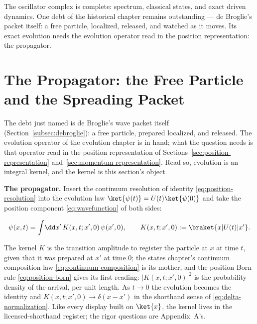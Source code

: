 The oscillator complex is complete: spectrum, classical states, and exact driven dynamics. One debt of the historical chapter remains outstanding --- de Broglie's packet itself: a free particle, localized, released, and watched as it moves. Its exact evolution needs the evolution operator read in the position representation: the propagator.

\section{The Propagator: the Free Particle and the Spreading Packet}
\label{sec:propagator}

The debt just named is de Broglie's wave packet itself (Section~\ref{subsec:debroglie}): a free particle, prepared localized, and released. The evolution operator of the evolution chapter is in hand; what the question needs is that operator read in the position representation of Sections~\ref{sec:position-representation} and~\ref{sec:momentum-representation}. Read so, evolution is an integral kernel, and the kernel is this section's object.

\medskip\noindent\textbf{The propagator.} Insert the continuum resolution of identity \eqref{eq:position-resolution} into the evolution law $\ket{\psi(t)} = U(t)\ket{\psi(0)}$ and take the position component \eqref{eq:wavefunction} of both sides:
\begin{linenomath}
    \begin{equation}
        \psi(x, t) = \int\!\dd x'\,K(x, t; x', 0)\,\psi(x', 0),
        \qquad
        K(x, t; x', 0) := \braket{x|U(t)|x'} .
        \label{eq:propagator-def}
    \end{equation}
\end{linenomath}
The kernel $K$ is the transition amplitude to register the particle at $x$ at time $t$, given that it was prepared at $x'$ at time $0$; the states chapter's continuum composition law \eqref{eq:continuum-composition} is its mother, and the position Born rule \eqref{eq:position-born} gives its first reading: $|K(x, t; x', 0)|^2$ is the probability density of the arrival, per unit length. As $t \to 0$ the evolution becomes the identity and $K(x, t; x', 0) \to \delta(x - x')$ in the shorthand sense of \eqref{eq:delta-normalization}. Like every display built on $\ket{x}$, the kernel lives in the licensed-shorthand register; the rigor questions are Appendix~A's.

